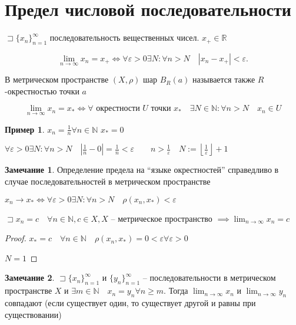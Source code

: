 \documentclass{book}
\newcommand\N{\ensuremath{\mathbb{N}}}
\newcommand\R{\ensuremath{\mathbb{R}}}
\theoremstyle{definition}
\newtheorem*{note}{Замечание}
\newtheorem*{example}{Пример}
\begin{document}
    \section{Предел числовой последовательности}

    \begin{definition}
        $\sqsupset \{x_n\}_{n=1}^{\infty }$ последовательность вещественных чисел. $x_{+}\in \R$

        \[
            \lim_{n \to \infty} x_n = x_+ \iff  \forall \varepsilon>0\exists N: \forall n>N \quad \left| x_n-x_+ \right| <\varepsilon
        .\]

        В метрическом пространстве $(X,\rho)$ шар $B_R(a)$ называется также $R$-окрестностью точки $a$
    \end{definition}

    \begin{definition}

        $$\lim_{n \to \infty} x_n = x_* \iff \forall \text{ окрестности $U$ точки } x_*\quad \exists N\in \N : \forall n>N\quad x_{n} \in U$$
    \end{definition}
    \begin{example}
            $x_n = \frac{1}{n} \forall n\in \N $
                $x_* = 0$

            $\forall \varepsilon > 0 \exists N: \forall n>N\quad \left| \frac{1}{n} - 0 \right|  = \frac{1}{n}<\varepsilon\qquad n>\frac{1}{\varepsilon}\quad N:= \left\lfloor \frac{1}{\varepsilon} \right\rfloor +1$
    \end{example}
    \begin{note}
        Определение предела на ``языке окрестностей'' справедливо в случае последовательностей в метрическом пространстве

        $x_n \to x_* \iff  \forall \varepsilon >0 \exists N: \forall n>N\quad \rho(x_n, x_*)<\varepsilon$
    \end{note}
    \begin{statement}
        $\sqsupset x_n=c\quad\forall n\in \N , c\in X, X$ -- метрическое пространство $\implies \lim_{n \to \infty } x_n = c$
    \end{statement}
    \begin{proof}
        $x_* = c\quad \forall n\in \N \quad \rho(x_n, x_*) = 0<\varepsilon \forall \varepsilon > 0$

        $N=1$
    \end{proof}
    \begin{note}
        $\sqsupset \{x_n\}_{n=1}^{\infty }$ и $\{y_n\}_{n=1}^{\infty }$ -- последовательности в метрическом пространстве $X$ и $\exists m\in \N \quad x_n = y_n \forall n\geqslant m$. Тогда $\lim_{n \to \infty} x_n$ и $\lim_{n \to \infty} y_n$ совпадают (если существует один, то существует другой и равны при существовании)
    \end{note}
\end{document}
